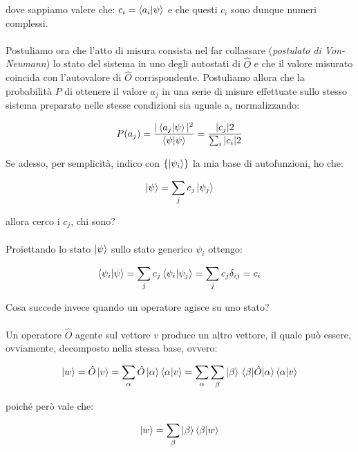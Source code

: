 	dove sappiamo valere che: $c_i = \braket{a_i}{\psi}$ e che questi $c_i$ sono dunque numeri complessi.
	\\
	\\
	Postuliamo ora che l'atto di misura consista nel far collassare (\textit{postulato di Von-Neumann}) lo stato del sistema in uno degli autostati di $\hat{O}$ e che il valore misurato coincida con l'autovalore di $\hat{O}$ corrispondente. Postuliamo allora che la probabilità $P$ di ottenere il valore $a_j$ in una serie di misure effettuate sullo stesso sistema preparato nelle stesse condizioni sia uguale a, normalizzando:

\begin{nb}
\begin{align*}
	P\qty(a_j) = \frac{|\braket{a_j}{\psi}|^2}{\braket{\psi}} = \frac{|c_j|2}{\sum_i |c_i|2}
\end{align*}
\end{nb}

	Se adesso, per semplicità, indico con $\qty{\ket{\psi_i}}$ la mia base di autofunzioni, ho che:

\begin{align*}
	\ket{\psi} = \sum_j c_j \ket{\psi_j}
\end{align*}

	allora cerco i $c_j$, chi sono?
	\\
	\\
	Proiettando lo stato $\ket{\psi}$ sullo stato generico $\psi_i$ ottengo:
	
\begin{align*}
	\braket{\psi_i}{\psi} = \sum_j c_j \braket{\psi_i}{\psi_j} = \sum_j c_j \delta_{ij} = c_i
\end{align*}

	Cosa succede invece quando un operatore agisce su uno stato?
	\\
	\\
	Un operatore $\hat{O}$ agente sul vettore $v$ produce un altro vettore, il quale può essere, ovviamente, decomposto nella stessa base, ovvero:
	
\begin{align*}
	\ket{w} = \hat{O} \ket{v} = \sum_{\alpha} \hat{O} \ket{\alpha} \braket{\alpha}{v} = \sum_{\alpha} \sum_{\beta} \ket{\beta} \mel{\beta}{\hat{O}}{\alpha} \braket{\alpha}{v}
\end{align*}

	poiché però vale che:

\begin{align*}
	\ket{w} = \sum_{\beta} \ket{\beta} \braket{\beta}{w}
\end{align*}

